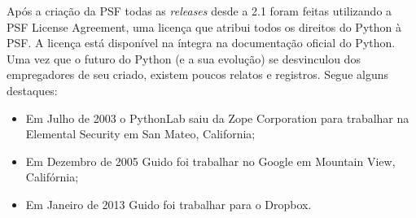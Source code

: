  
Após a criação da PSF todas as \textit{releases} desde a 2.1 foram feitas utilizando a PSF License Agreement, uma licença que atribui todos os direitos do Python à PSF.
A licença está disponível na íntegra na documentação oficial do Python.
Uma vez que o futuro do Python (e a sua evolução) se desvinculou dos empregadores de seu criado, existem poucos relatos e registros.
Segue alguns destaques:
\begin{itemize} 
    \item Em Julho de 2003 o PythonLab saiu da Zope Corporation para trabalhar na Elemental Security em San Mateo, California;
    \item Em Dezembro de 2005 Guido foi trabalhar no Google em Mountain View, Califórnia;
    \item Em Janeiro de 2013 Guido foi trabalhar para o Dropbox.
\end{itemize}
